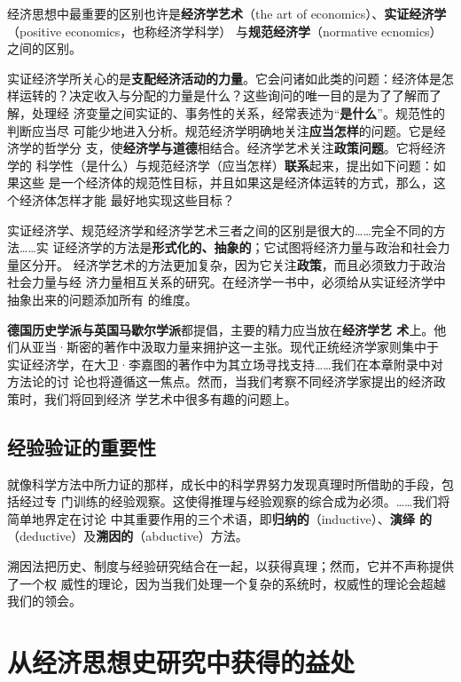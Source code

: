 经济思想中最重要的区别也许是\textbf{经济学艺术}（the art of
economics）、\textbf{实证经济学}（positive economics，也称经济学科学）
与\textbf{规范经济学}（normative ecnomics）之间的区别。

实证经济学所关心的是\textbf{支配经济活动的力量}。它会问诸如此类的问题：经济体是怎
样运转的？决定收入与分配的力量是什么？这些询问的唯一目的是为了了解而了解，处理经
济变量之间实证的、事务性的关系，经常表述为“\textbf{是什么}”。规范性的判断应当尽
可能少地进入分析。规范经济学明确地关注\textbf{应当怎样}的问题。它是经济学的哲学分
支，使\textbf{经济学与道德}相结合。经济学艺术关注\textbf{政策问题}。它将经济学的
科学性（是什么）与规范经济学（应当怎样）\textbf{联系}起来，提出如下问题：如果这些
是一个经济体的规范性目标，并且如果这是经济体运转的方式，那么，这个经济体怎样才能
最好地实现这些目标？

实证经济学、规范经济学和经济学艺术三者之间的区别是很大的……完全不同的方法……实
证经济学的方法是\textbf{形式化的、抽象的}；它试图将经济力量与政治和社会力量区分开。
经济学艺术的方法更加复杂，因为它关注\textbf{政策}，而且必须致力于政治社会力量与经
济力量相互关系的研究。在经济学一书中，必须给从实证经济学中抽象出来的问题添加所有
的维度。

\textbf{德国历史学派与英国马歇尔学派}都提倡，主要的精力应当放在\textbf{经济学艺
  术}上。他们从亚当·斯密的著作中汲取力量来拥护这一主张。现代正统经济学家则集中于
实证经济学，在大卫·李嘉图的著作中为其立场寻找支持……我们在本章附录中对方法论的讨
论也将遵循这一焦点。然而，当我们考察不同经济学家提出的经济政策时，我们将回到经济
学艺术中很多有趣的问题上。

\subsection{经验验证的重要性}

就像科学方法中所力证的那样，成长中的科学界努力发现真理时所借助的手段，包括经过专
门训练的经验观察。这使得推理与经验观察的综合成为必须。……我们将简单地界定在讨论
中其重要作用的三个术语，即\textbf{归纳的}（inductive）、\textbf{演绎
  的}（deductive）及\textbf{溯因的}（abductive）方法。

溯因法把历史、制度与经验研究结合在一起，以获得真理；然而，它并不声称提供了一个权
威性的理论，因为当我们处理一个复杂的系统时，权威性的理论会超越我们的领会。

\section{从经济思想史研究中获得的益处}
\clearpage

